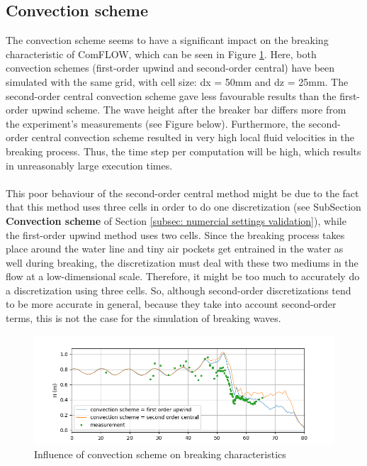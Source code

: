 \subsection{Convection scheme}
\label{subsec: breakerbar on convection scheme} 
The convection scheme seems to have a significant impact on the breaking characteristic of ComFLOW, which can be seen in Figure \ref{fig:breakerbarexperiment convection scheme}. Here, both convection schemes (first-order upwind and second-order central) have been simulated with the same grid, with cell size: dx = 50mm and dz = 25mm. The second-order central convection scheme gave less favourable results than the first-order upwind scheme. The wave height after the breaker bar differs more from the experiment's measurements (see Figure below). Furthermore, the second-order central convection scheme resulted in very high local fluid velocities in the breaking process. Thus, the time step per computation will be high, which results in unreasonably large execution times.\\
\\
This poor behaviour of the second-order central method might be due to the fact that this method uses three cells in order to do one discretization (see SubSection \textbf{Convection scheme} of Section \ref{subsec: numercial settings validation}), while the first-order upwind method uses two cells. Since the breaking process takes place around the water line and tiny air pockets get entrained in the water as well during breaking, the discretization must deal with these two mediums in the flow at a low-dimensional scale. Therefore, it might be too much to accurately do a discretization using three cells. So, although second-order discretizations tend to be more accurate in general, because they take into account second-order terms, this is not the case for the simulation of breaking waves. 



\begin{figure}[H]
    \centering
    \includegraphics[width=\linewidth]{figures/Validation/plot_stats_compare_H-1_2ndordercentral.png}
    \caption{Influence of convection scheme on breaking characteristics}
    \label{fig:breakerbarexperiment convection scheme}
\end{figure}



